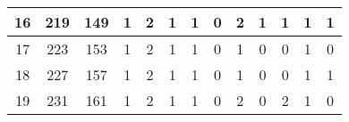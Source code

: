 \begin{sidewaystable}
\begin{tabular}{|c|c|c|c|c|c|c|c|c|c|c|c|c|}
		16                                                & 219                                               & 149                                               & 1                                                 & 2                                                 & 1                                                 & 1                                                 & 0                                                 & 2                                                 & 1                                                 & 1                                                 & 1                                                 & 1                                                 \\ \hline
		17                                                & 223                                               & 153                                               & 1                                                 & 2                                                 & 1                                                 & 1                                                 & 0                                                 & 1                                                 & 0                                                 & 0                                                 & 1                                                 & 0                                                 \\ \hline
		18                                                & 227                                               & 157                                               & 1                                                 & 2                                                 & 1                                                 & 1                                                 & 0                                                 & 1                                                 & 0                                                 & 0                                                 & 1                                                 & 1                                                 \\ \hline
		19                                                & 231                                               & 161                                               & 1                                                 & 2                                                 & 1                                                 & 1                                                 & 0                                                 & 2                                                 & 0                                                 & 2                                                 & 1                                                 & 0                                                 \\ \hline

\end{tabular}
\end{sidewaystable}
